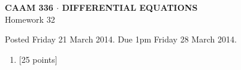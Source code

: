 \documentclass[10pt]{article}
\begin{document}
\vspace*{-5em}
\begin{center}
\large \textsf{\textbf{CAAM 336 $\cdot$ DIFFERENTIAL EQUATIONS}\\[0.5em]
Homework 32 }
\end{center}

Posted Friday 21 March 2014.  Due 1pm Friday 28 March 2014.

\begin{enumerate}\addtocounter{enumi}{31}
\item {[25 points]}\\  

\end{enumerate}
\end{document}
